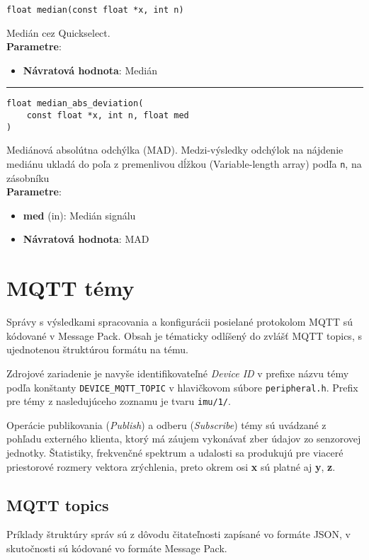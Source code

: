 \begin{lstlisting}[style=docs]
float median(const float *x, int n)
\end{lstlisting}
Medián cez Quickselect. \\ 
\textbf{Parametre}:
\begin{itemize}[noitemsep, topsep=0pt]
	\item \textbf{Návratová hodnota}: Medián
\end{itemize}
\bigbreak
\hrule

\begin{lstlisting}[style=docs]
float median_abs_deviation(
	const float *x, int n, float med
)
\end{lstlisting}
Mediánová absolútna odchýlka (MAD).  Medzi-výsledky odchýlok na nájdenie mediánu ukladá
do poľa z premenlivou dĺžkou (Variable-length array) podľa \verb|n|, na zásobníku \\
\textbf{Parametre}:
\begin{itemize}[noitemsep, topsep=0pt]
	\item \textbf{med} (in):  Medián signálu
	\item \textbf{Návratová hodnota}: MAD
\end{itemize}
\bigbreak

\section{MQTT témy}
Správy s výsledkami spracovania a konfigurácii posielané protokolom MQTT sú kódované v Message Pack.
Obsah je tématicky odlíšený do zvlášť MQTT topics, s ujednotenou štruktúrou formátu na tému.

Zdrojové zariadenie je navyše identifikovateľné \emph{Device ID} v prefixe názvu témy podľa konštanty
\verb|DEVICE_MQTT_TOPIC| v hlavičkovom súbore \verb|peripheral.h|. Prefix pre témy z nasledujúceho zoznamu je 
tvaru \verb|imu/1/|. 

Operácie publikovania (\emph{Publish}) a odberu (\emph{Subscribe}) témy sú uvádzané z pohľadu
externého klienta, ktorý má záujem vykonávať zber údajov zo senzorovej jednotky. Štatistiky, frekvenčné spektrum
a udalosti sa produkujú pre viaceré priestorové rozmery vektora zrýchlenia, preto okrem osi \textbf{x} sú platné 
aj \textbf{y}, \textbf{z}.
\bigbreak

\subsection*{MQTT topics}
Príklady štruktúry správ sú z dôvodu čitateľnosti zapísané vo formáte JSON, v skutočnosti sú
kódované vo formáte Message Pack.

